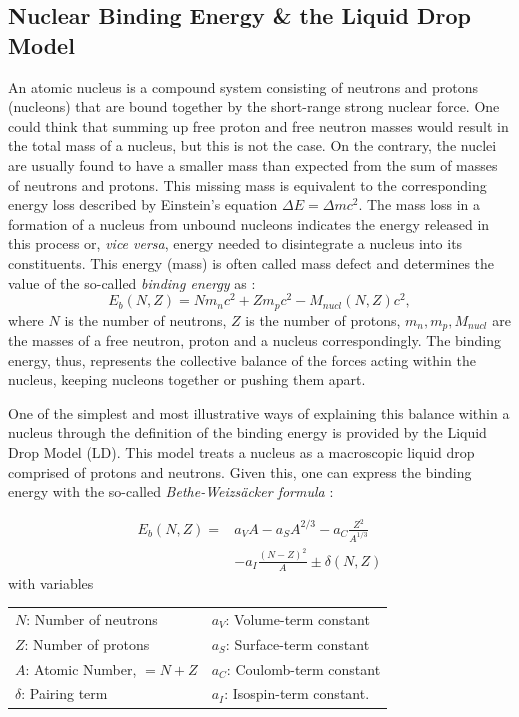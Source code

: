 \documentclass[numberedappendix, twocolappendix]{emulateapj}
\begin{document}
\subsection{Nuclear Binding Energy \& the Liquid Drop Model}
\label{sec: LD}
An atomic nucleus is a compound system consisting of neutrons and protons (nucleons) that are bound together by the short-range strong nuclear force. One could think that summing up free proton and free neutron masses would result in the total mass of a nucleus, but this is not the case. On the contrary, the nuclei are usually found to have a smaller mass than expected from the sum of masses of neutrons and protons. This missing mass is equivalent to the corresponding energy loss described by Einstein's equation $\Delta E=\Delta mc^2$. The mass loss in a formation of a nucleus from unbound nucleons indicates the energy released in this process or, \textit{vice versa}, energy needed to disintegrate a nucleus into its constituents. This energy (mass) is often called mass defect and determines the value of the so-called \textit{binding energy} as \cite{krane}:
\begin{equation}
    E_b(N,Z) = Nm_nc^2+Zm_pc^2-M_{nucl}(N,Z)c^2,
\end{equation}
where $N$ is the number of neutrons, $Z$ is the number of protons, $m_n, m_p, M_{nucl}$ are the masses of a free neutron, proton and a nucleus correspondingly. The binding energy, thus, represents the collective balance of the forces acting within the nucleus, keeping nucleons together or pushing them apart.


One of the simplest and most illustrative ways of explaining this balance within a nucleus through the definition of the binding energy is provided by the Liquid Drop Model (LD). This model treats a nucleus as a macroscopic liquid drop comprised of protons and neutrons. Given this, one can express the binding energy with the so-called \textit{Bethe-Weizsäcker formula} \cite{krane}:

\begin{equation}\label{eq: binding energy}
\begin{split}
    E_b(N,Z) =& a_V A - a_S A^{2/3} - a_C\frac{Z^2}{A^{1/3}} \\ &- a_I \frac{(N-Z)^2}{A}\pm \delta(N,Z)
\end{split}
\end{equation}
with variables
\begin{table}[H]
\centering
\begin{tabular}{ m{4cm} m{4cm} }
 $N$: Number of neutrons & $a_V$: Volume-term constant \\ 
 $Z$: Number of protons & $a_S$: Surface-term constant\\ 
 $A$: Atomic Number, $=N+Z$ & $a_C$: Coulomb-term constant\\
 $\delta$: Pairing term & $a_I$: Isospin-term constant.\\
\end{tabular}
\label{tab:table}
\end{table}
\end{document}
